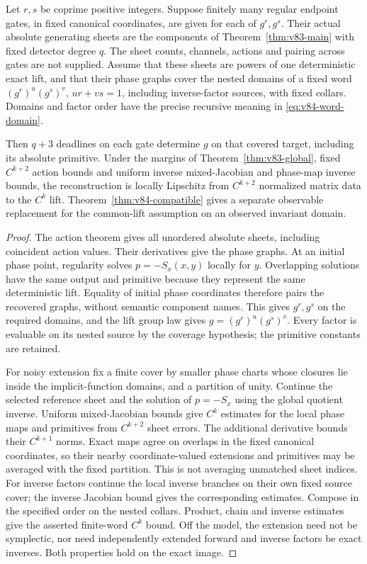 \begin{theorem}
\label{thm:v83-return}
Let $r,s$ be coprime positive integers. Suppose finitely many regular
endpoint gates, in fixed canonical coordinates, are given for each
of $g^r,g^s$. Their actual absolute generating sheets are the components
of Theorem~\ref{thm:v83-main} with fixed detector degree $q$. The
sheet counts, channels, actions and pairing across gates are not
supplied. Assume that these sheets are powers of one deterministic
exact lift, and that their phase graphs cover the nested domains of
a fixed word $(g^r)^u(g^s)^v$, $ur+vs=1$, including inverse-factor
sources, with fixed collars. Domains and factor order have the precise
recursive meaning in \eqref{eq:v84-word-domain}.

Then $q+3$ deadlines on each gate determine $g$ on that covered target,
including its absolute primitive. Under the margins of
Theorem~\ref{thm:v83-global}, fixed $C^{k+2}$ action bounds and uniform
inverse mixed-Jacobian and phase-map inverse bounds, the reconstruction
is locally Lipschitz from $C^{k+2}$ normalized matrix data to the $C^k$
lift. Theorem~\ref{thm:v84-compatible} gives a separate observable
replacement for the common-lift assumption on an observed invariant
domain.
\end{theorem}
\begin{proof}
The action theorem gives all unordered absolute sheets, including
coincident action values. Their derivatives give the phase graphs.
At an initial phase point, regularity solves $p=-S_x(x,y)$ locally
for $y$. Overlapping solutions have the same output and primitive
because they represent the same deterministic lift. Equality of
initial phase coordinates therefore pairs the recovered graphs,
without semantic component names. This gives $g^r,g^s$ on the required
domains, and the lift group law gives
$g=(g^r)^u(g^s)^v$. Every factor is evaluable on its nested source
by the coverage hypothesis; the primitive constants are retained.

For noisy extension fix a finite cover by smaller phase charts whose
closures lie inside the implicit-function domains, and a partition
of unity. Continue the selected reference sheet and the solution of
$p=-S_x$ using the global quotient inverse. Uniform mixed-Jacobian
bounds give $C^k$ estimates for the local phase maps and primitives
from $C^{k+2}$ sheet errors. The additional derivative bounds their
$C^{k+1}$ norms. Exact maps agree on overlaps in the fixed canonical
coordinates, so their nearby coordinate-valued extensions and
primitives may be averaged with the fixed partition. This is not
averaging unmatched sheet indices. For inverse factors continue the
local inverse branches on their own fixed source cover; the inverse
Jacobian bound gives the corresponding estimates. Compose in the
specified order on the nested collars. Product, chain and inverse
estimates give the asserted finite-word $C^k$ bound. Off the model,
the extension need not be symplectic, nor need independently extended
forward and inverse factors be exact inverses. Both properties hold
on the exact image.
\end{proof}

